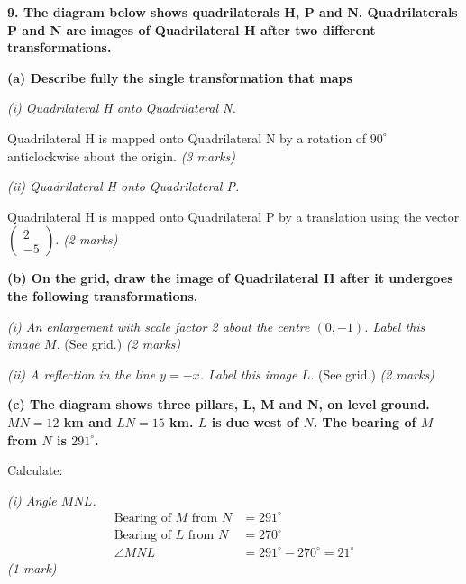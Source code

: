 \documentclass[12pt,a4paper]{article}
\newcommand{\qhead}[1]{\vspace{0.6em}\noindent\textbf{\large #1}\par\vspace{0.3em}}
\newcommand{\subhead}[1]{\vspace{0.3em}\noindent\textbf{#1}\par}
\newcommand{\qmarks}[1]{\hfill\textit{(#1)}}
\begin{document}
\qhead{9. The diagram below shows quadrilaterals H, P and N. Quadrilaterals P and N are images of Quadrilateral H after two different transformations.}

\begin{center}
\end{center}

\subhead{(a) Describe fully the single transformation that maps}

\textit{(i) Quadrilateral H onto Quadrilateral N.}

Quadrilateral H is mapped onto Quadrilateral N by a rotation of $90^{\circ}$ anticlockwise about the origin.
\qmarks{3 marks}

\textit{(ii) Quadrilateral H onto Quadrilateral P.}

Quadrilateral H is mapped onto Quadrilateral P by a translation using the vector $\begin{pmatrix} 2 \\ -5 \end{pmatrix}$.
\qmarks{2 marks}

\subhead{(b) On the grid, draw the image of Quadrilateral H after it undergoes the following transformations.}

\textit{(i) An enlargement with scale factor 2 about the centre $(0,-1)$. Label this image $M$.} (See grid.)
\qmarks{2 marks}

\textit{(ii) A reflection in the line $y = -x$. Label this image $L$.} (See grid.)
\qmarks{2 marks}

\subhead{(c) The diagram shows three pillars, L, M and N, on level ground. $MN = 12$ km and $LN = 15$ km. $L$ is due west of $N$. The bearing of $M$ from $N$ is $291^{\circ}$.}

\begin{center}
\end{center}

Calculate:

\textit{(i) Angle $MNL$.}
\begin{align*}
\text{Bearing of } M \text{ from } N &= 291^{\circ} \\
\text{Bearing of } L \text{ from } N &= 270^{\circ} \\
\angle MNL &= 291^{\circ} - 270^{\circ} = 21^{\circ}
\end{align*}
\qmarks{1 mark}
\end{document}
